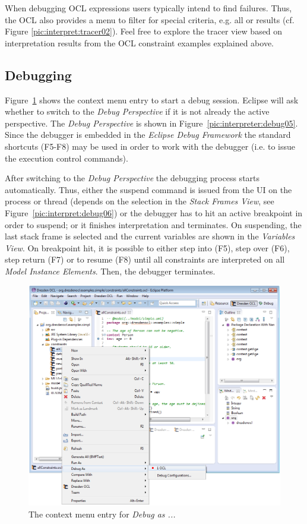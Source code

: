 When debugging OCL expressions users typically intend to find failures. Thus,
the \acs{OCL}  also provides a menu to filter for special
criteria, e.g. all  or  results (cf. Figure
\ref{pic:interpret:tracer02}). Feel free to explore the tracer view based on
interpretation results from the \acs{OCL} constraint examples explained above.

\subsection{Debugging}

Figure~\ref{pic:interpret:debug01} shows the context menu entry to start a debug
session. Eclipse will ask whether to switch to the \emph{Debug Perspective} if it
is not already the active perspective.
The \emph{Debug Perspective} is shown in Figure~\ref{pic:interpreter:debug05}.
Since the debugger is embedded in the \emph{Eclipse Debug Framework} the standard shortcuts
(F5-F8) may be used in order to work with the debugger (i.e. to issue the execution control commands).

After switching to the \emph{Debug Perspective} the debugging process starts automatically.
Thus, either the suspend command is issued from the UI on the process or thread
(depends on the selection in the \emph{Stack Frames View}, see
Figure~\ref{pic:interpret:debug06}) or the debugger has to hit an active breakpoint in
order to suspend; or it finishes interpretation and terminates. On suspending,
the last stack frame is selected and the current variables are shown
in the \emph{Variables View}. On breakpoint hit, it is possible to either step into (F5), step over (F6),
step return (F7) or to resume (F8) until all constraints are interpreted on all \emph{Model Instance Elements}.
Then, the debugger terminates.

\begin{figure}[tbp]
	\centering
	\includegraphics[width=\textwidth,height=\textheight,keepaspectratio]{figures/interpreter/debug01}
  \caption{The context menu entry for \emph{Debug as ...}}
  \label{pic:interpret:debug01}
\end{figure}

